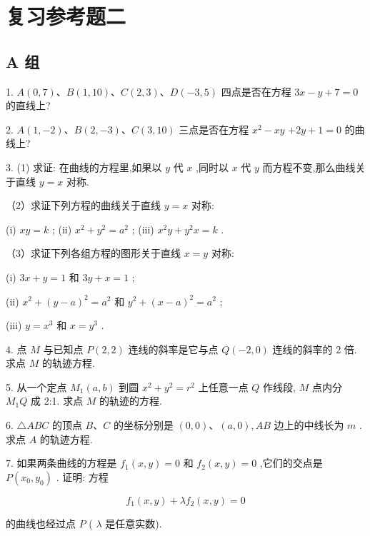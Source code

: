 \documentclass[lang=cn,newtx,10pt,scheme=chinese]{elegantbook}
\begin{document}
\chapter*{复习参考题二}

\section*{A 组}

1. \(A\left( {0,7}\right) \text{、}B\left( {1,{10}}\right) \text{、}C\left( {2,3}\right) \text{、}D\left( {-3,5}\right)\) 四点是否在方程 \({3x} - y + 7 = 0\) 的直线上?

2. \(A\left( {1, - 2}\right) \text{、}B\left( {2, - 3}\right) \text{、}C\left( {3,{10}}\right)\) 三点是否在方程 \({x}^{2} - {xy}\) \(+ {2y} + 1 = 0\) 的曲线上?

3. (1) 求证: 在曲线的方程里,如果以 \(y\) 代 \(x\) ,同时以 \(x\) 代 \(y\) 而方程不变,那么曲线关于直线 \(y = x\) 对称.

（2）求证下列方程的曲线关于直线 \(y = x\) 对称:

(i) \({xy} = k\) ; (ii) \({x}^{2} + {y}^{2} = {a}^{2}\) ; (iii) \({x}^{2}y + {y}^{2}x = k\) .

（3）求证下列各组方程的图形关于直线 \(x = y\) 对称:

(i) \({3x} + y = 1\) 和 \({3y} + x = 1\) ;

(ii) \({x}^{2} + {\left( y - a\right) }^{2} = {a}^{2}\) 和 \({y}^{2} + {\left( x - a\right) }^{2} = {a}^{2}\) ;

(iii) \(y = {x}^{3}\) 和 \(x = {y}^{3}\) .

4. 点 \(M\) 与已知点 \(P\left( {2,2}\right)\) 连线的斜率是它与点 \(Q\left( {-2,0}\right)\) 连线的斜率的 2 倍. 求点 \(M\) 的轨迹方程.

5. 从一个定点 \({M}_{1}\left( {a,b}\right)\) 到圆 \({x}^{2} + {y}^{2} = {r}^{2}\) 上任意一点 \(Q\) 作线段, \(M\) 点内分 \({M}_{1}Q\) 成 2:1. 求点 \(M\) 的轨迹的方程.

6. \(\bigtriangleup {ABC}\) 的顶点 \(B\text{、}C\) 的坐标分别是 \(\left( {0,0}\right) \text{、}\left( {a,0}\right) ,{AB}\) 边上的中线长为 \(m\) . 求点 \(A\) 的轨迹方程.

7. 如果两条曲线的方程是 \({f}_{1}\left( {x,y}\right) = 0\) 和 \({f}_{2}\left( {x,y}\right) = 0\) ,它们的交点是 \(P\left( {{x}_{0},{y}_{0}}\right)\) . 证明: 方程

\[
    {f}_{1}\left( {x,y}\right) + \lambda {f}_{2}\left( {x,y}\right) = 0
\]

的曲线也经过点 \(P\) ( \(\lambda\) 是任意实数).
\end{document}
